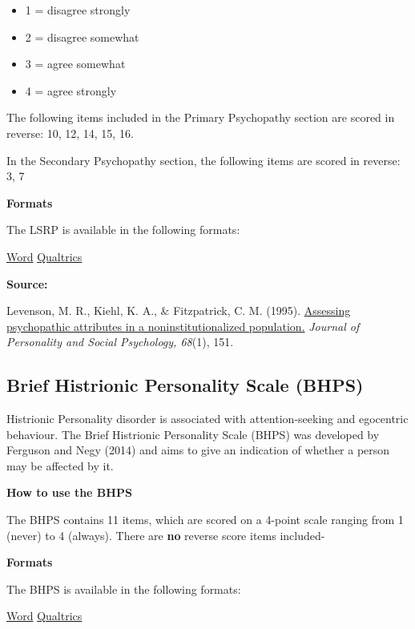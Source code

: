 \documentclass[
]{book}
\providecommand{\tightlist}{%
  \setlength{\itemsep}{0pt}\setlength{\parskip}{0pt}}
\begin{document}
\begin{itemize}
\tightlist
\item
  1 = disagree strongly
\item
  2 = disagree somewhat
\item
  3 = agree somewhat
\item
  4 = agree strongly
\end{itemize}

The following items included in the Primary Psychopathy section are scored in reverse: 10, 12, 14, 15, 16.

In the Secondary Psychopathy section, the following items are scored in reverse: 3, 7

\textbf{Formats}

The LSRP is available in the following formats:

\href{link\%20to\%20file}{Word} \textbar{} \href{link\%20to\%20file}{Qualtrics}

\textbf{Source:}

Levenson, M. R., Kiehl, K. A., \& Fitzpatrick, C. M. (1995). \href{https://www.researchgate.net/profile/Michael_Levenson2/publication/15338539_Assessing_Psychopathic_Attributes_in_a_Noninstitutionalized_Population/links/54b6d8360cf2bd04be334b31.pdf}{Assessing psychopathic attributes in a noninstitutionalized population.} \emph{Journal of Personality and Social Psychology, 68}(1), 151.

\hypertarget{brief-histrionic-personality-scale-bhps}{%
\subsection{Brief Histrionic Personality Scale (BHPS)}\label{brief-histrionic-personality-scale-bhps}}

Histrionic Personality disorder is associated with attention-seeking and egocentric behaviour. The Brief Histrionic Personality Scale (BHPS) was developed by Ferguson and Negy (2014) and aims to give an indication of whether a person may be affected by it.

\textbf{How to use the BHPS}

The BHPS contains 11 items, which are scored on a 4-point scale ranging from 1 (never) to 4 (always). There are \textbf{no} reverse score items included-

\textbf{Formats}

The BHPS is available in the following formats:

\href{link\%20to\%20file}{Word} \textbar{} \href{link\%20to\%20file}{Qualtrics}
\end{document}

